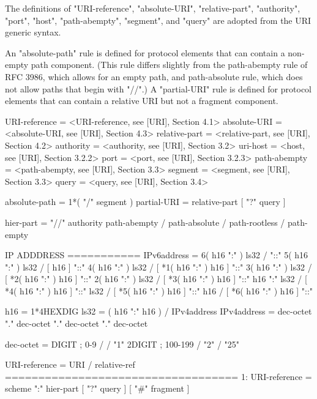 The definitions of "URI-reference", "absolute-URI", "relative-part", "authority", "port", "host", "path-abempty", "segment", and "query" 
are adopted from the URI generic syntax.

An "absolute-path" rule is defined for protocol elements that can contain a non-empty path component.
(This rule differs slightly from the path-abempty rule of RFC 3986, which allows for an empty path, 
and path-absolute rule, which does not allow paths that begin with "//".) A "partial-URI" rule is defined for 
protocol elements that can contain a relative URI but not a fragment component.

  URI-reference = <URI-reference, see [URI], Section 4.1>
  absolute-URI  = <absolute-URI, see [URI], Section 4.3>
  relative-part = <relative-part, see [URI], Section 4.2>
  authority     = <authority, see [URI], Section 3.2>
  uri-host      = <host, see [URI], Section 3.2.2>
  port          = <port, see [URI], Section 3.2.3>
  path-abempty  = <path-abempty, see [URI], Section 3.3>
  segment       = <segment, see [URI], Section 3.3>
  query         = <query, see [URI], Section 3.4>

  absolute-path = 1*( "/" segment )
  partial-URI   = relative-part [ "?" query ]

  hier-part		= "//" authority path-abempty
				/ path-absolute
                / path-rootless
                / path-empty

IP ADDDRESS
===========
IPv6address   =                            6( h16 ":" ) ls32
                 /                       "::" 5( h16 ":" ) ls32
                 / [               h16 ] "::" 4( h16 ":" ) ls32
                 / [ *1( h16 ":" ) h16 ] "::" 3( h16 ":" ) ls32
                 / [ *2( h16 ":" ) h16 ] "::" 2( h16 ":" ) ls32
                 / [ *3( h16 ":" ) h16 ] "::"    h16 ":"   ls32
                 / [ *4( h16 ":" ) h16 ] "::"              ls32
                 / [ *5( h16 ":" ) h16 ] "::"              h16
                 / [ *6( h16 ":" ) h16 ] "::"

   h16           = 1*4HEXDIG
   ls32          = ( h16 ":" h16 ) / IPv4address
   IPv4address   = dec-octet "." dec-octet "." dec-octet "." dec-octet

   dec-octet     = DIGIT                 ; 0-9
                 / %
                 / "1" 2DIGIT            ; 100-199
                 / "2" %
                 / "25" %

URI-reference = URI / relative-ref
===================================
1: URI-reference = scheme ":" hier-part [ "?" query ] [ "#" fragment ]
		 
